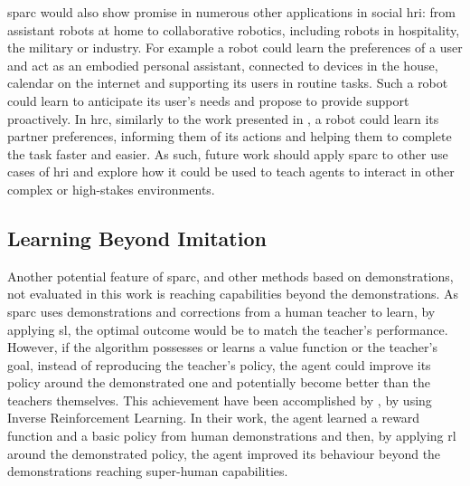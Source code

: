 \gls{sparc} would also show promise in numerous other applications in social \gls{hri}: from assistant robots at home to collaborative robotics, including robots in hospitality, the military or industry. For example a robot could learn the preferences of a user and act as an embodied personal assistant, connected to devices in the house, calendar on the internet and supporting its users in routine tasks. Such a robot could learn to anticipate its user's needs and propose to provide support proactively. In \gls{hrc}, similarly to the work presented in \cite{munzer2017efficient}, a robot could learn its partner preferences, informing them of its actions and helping them to complete the task faster and easier. As such, future work should apply \gls{sparc} to other use cases of \gls{hri} and explore how it could be used to teach agents to interact in other complex or high-stakes environments.


\subsection{Learning Beyond Imitation}\label{sec:disc_beyond}

Another potential feature of \gls{sparc}, and other methods based on demonstrations, not evaluated in this work is reaching capabilities beyond the demonstrations. As \gls{sparc} uses demonstrations and corrections from a human teacher to learn, by applying \gls{sl}, the optimal outcome would be to match the teacher's performance. However, if the algorithm possesses or learns a value function or the teacher's goal, instead of reproducing the teacher's policy, the agent could improve its policy around the demonstrated one and potentially become better than the teachers themselves. This achievement have been accomplished by \cite{abbeel2004apprenticeship}, by using Inverse Reinforcement Learning. In their work, the agent learned a reward function and a basic policy from human demonstrations and then, by applying \gls{rl} around the demonstrated policy, the agent improved its behaviour beyond the demonstrations reaching super-human capabilities. 

